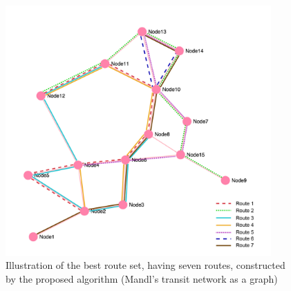 \begin{figure}[H]
    \begin{center}
    \includegraphics[width=4in]{assets/mandlnetwork_7routes.png}
    \end{center}
    \caption{Illustration of the best route set, having seven routes, constructed by the proposed algorithm (Mandl's transit network as a graph)}
    \label{fig:bestRouteSet7} 
\end{figure}

